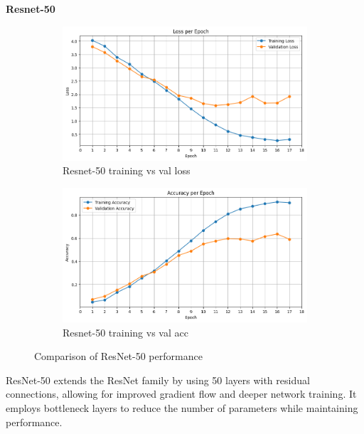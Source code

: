 \documentclass[12pt]{article}
\begin{document}
\textbf{Resnet-50}

\begin{figure}[ht]
    \centering
    \begin{subfigure}{0.45\linewidth}
        \centering
        \includegraphics[width=\linewidth]{t3_res50_loss.png}
        \caption{Resnet-50 training vs val loss}
        \label{fig:t3_res50_loss}
    \end{subfigure}
    \hfill
    \begin{subfigure}{0.45\linewidth}
        \centering
        \includegraphics[width=\linewidth]{t3_res50_acc.png}
        \caption{Resnet-50 training vs val acc}
        \label{fig:t3_res50_acc}
    \end{subfigure}
    \caption{Comparison of ResNet-50 performance}
    \label{fig:t3_res50_performance}
\end{figure}

ResNet-50 extends the ResNet family by using 50 layers with residual connections, allowing for improved gradient flow and deeper network training. It employs bottleneck layers to reduce the number of parameters while maintaining performance.
\end{document}
